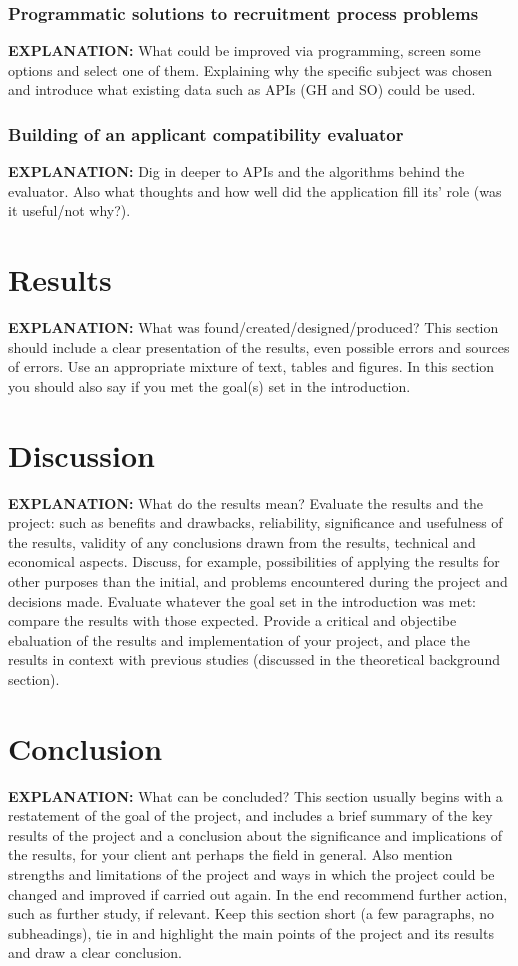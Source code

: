 \documentclass[11pt,a4paper,oneside,article]{memoir}
\begin{document}
\subsection{Programmatic solutions to recruitment process problems}
\textbf{EXPLANATION:} What could be improved via programming, screen some options and select one of them. Explaining why the specific subject was chosen and introduce what existing data such as APIs (GH and SO) could be used.

\subsection{Building of an applicant compatibility evaluator}
\textbf{EXPLANATION:} Dig in deeper to APIs and the algorithms behind the evaluator. Also what thoughts and how well did the application fill its’ role (was it useful/not why?).
\chapter{Results}
\textbf{EXPLANATION:} What was found/created/designed/produced? This section should include a clear presentation of the results, even possible errors and sources of errors. Use an appropriate mixture of text, tables and figures. In this section you should also say if you met the goal(s) set in the introduction.
\chapter{Discussion}
\textbf{EXPLANATION:} What do the results mean? Evaluate the results and the project: such as benefits and drawbacks, reliability, significance and usefulness of the results, validity of any conclusions drawn from the results, technical and economical aspects. Discuss, for example, possibilities of applying the results for other purposes than the initial, and problems encountered during the project and decisions made. Evaluate whatever the goal set in the introduction was met: compare the results with those expected. Provide a critical and objectibe ebaluation of the results and implementation of your project, and place the results in context with previous studies (discussed in the theoretical background section).
\chapter{Conclusion}
\textbf{EXPLANATION:} What can be concluded? This section usually begins with a restatement of the goal of the project, and includes a brief summary of the key results of the project and a conclusion about the significance and implications of the results, for your client ant perhaps the field in general. Also mention strengths and limitations of the project and ways in which the project could be changed and improved if carried out again. In the end recommend further action, such as further study, if relevant. Keep this section short (a few paragraphs, no subheadings), tie in and highlight the main points of the project and its results and draw a clear conclusion.
\end{document}
